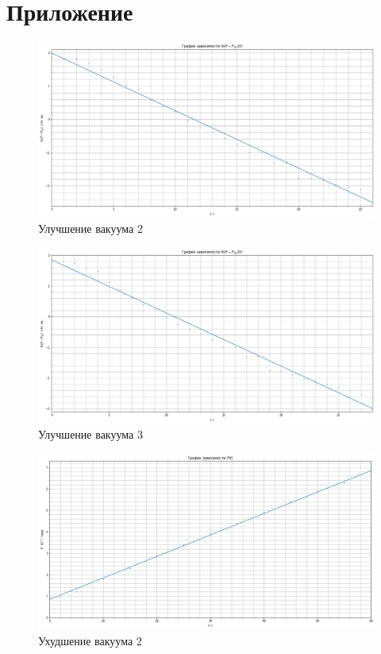 \documentclass[a4paper,12pt]{article}
\theoremstyle{definition}
\begin{document}
	\newpage
	
	\section{Приложение}
	
	\centering
	\begin{figure}[h!]
		\includegraphics[scale=0.43]{graphdown3}
		\caption{Улучшение вакуума 2}
		\label{graph3}
	\end{figure}

	\begin{figure}[h!]
		\includegraphics[scale=0.43]{graphdown4}
		\caption{Улучшение вакуума 3}
		\label{graph4}
	\end{figure}
	
	\begin{figure}[h!]
		\includegraphics[scale=0.43]{graphup2}
		\caption{Ухудшение вакуума 2}
		\label{graphup2}
	\end{figure}
\end{document}
